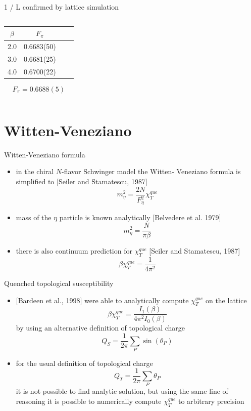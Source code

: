 \documentclass[english]{beamer}
\begin{document}
\begin{frame}{1 / L confirmed by lattice simulation}
\begin{columns}[t]
      \begin{center} 
	    \begin{tabular}{c c c c}
	      $\beta$ & $F_\pi$ \\
	      \hline
	      2.0 & 0.6683(50) \\
	      \hline
	      3.0 & 0.6681(25) \\
	      \hline
	      4.0 & 0.6700(22) \\
	    \end{tabular}
        \[
      	  F_\pi = 0.6688(5)
        \]
      \end{center}	 
  \end{columns}
\end{frame}


\section{Witten-Veneziano}

\begin{frame}{Witten-Veneziano formula}
  \begin{itemize}
    \item in the chiral $N$-flavor Schwinger model the Witten-
      Veneziano formula is simplified to [Seiler and Stamatescu,
      1987]
      \[
        m_\eta^2 = \frac{2N}{F_\eta^2}\chi_T^{que}
      \]
    \item mass of the $\eta$ particle is known analytically
      [Belvedere et al. 1979] 
      \[
        m_\eta^2 = \frac{N}{\pi\beta}
      \]
    \item there is also continuum prediction for $\chi_T^{que}$
      [Seiler and Stamatescu, 1987]
      \[
        \beta\chi_T^{que} = \frac{1}{4\pi^2}
      \]
  \end{itemize}
\end{frame}

\begin{frame}{Quenched topological susceptibility}
  \begin{itemize}
    \item {[Bardeen et al., 1998]} were able to analytically
      compute $\chi_T^{que}$ on the lattice
      \[
        \beta\chi_T^{que} = \frac{I_1(\beta)}{4 \pi^2 I_0(\beta)}
      \]
      by using an alternative definition of topological charge
      \[
        Q_S = \frac{1}{2\pi}\sum_{P}\sin(\theta_P)
      \]
    \item for the usual definition of topological charge
      \[
        Q_T = \frac{1}{2\pi}\sum_{P}\theta_P
      \]
      it is not possible to find analytic solution, but using the 
      same line of reasoning it is possible to numerically compute
      $\chi_T^{que}$ to arbitrary precision
  \end{itemize}
\end{frame}
\end{document}
